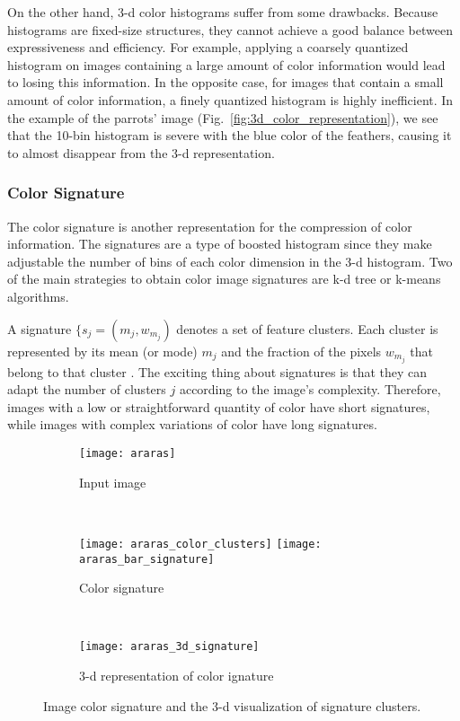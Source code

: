 On the other hand, 3-d color histograms suffer from some drawbacks. Because histograms are fixed-size structures, they cannot achieve a good balance between expressiveness and efficiency. For example, applying a coarsely quantized histogram on images containing a large amount of color information would lead to losing this information. In the opposite case, for images that contain a small amount of color information, a finely quantized histogram is highly inefficient. In the example of the parrots' image (Fig.\ \ref{fig:3d_color_representation}), we see that the 10-bin histogram is severe with the blue color of the feathers, causing it to almost disappear from the 3-d representation.

\subsubsection{Color Signature}

The color signature is another representation for the compression of color information. The signatures are a type of boosted histogram since they make adjustable the number of bins of each color dimension in the 3-d histogram. Two of the main strategies to obtain color image signatures are k-d tree or k-means algorithms.

A signature $\{s_j = (m_j, w_{m_j})$ denotes a set of feature clusters. Each cluster is represented by its mean (or mode) $m_j$ and the fraction of the pixels $w_{m_j}$ that belong to that cluster \citep{Rubner.Tomasi:Book:2001}. The exciting thing about signatures is that they can adapt the number of clusters $j$ according to the image's complexity. Therefore, images with a low or straightforward quantity of color have short signatures, while images with complex variations of color have long signatures.

\begin{figure}[!ht]
    \centering
    \begin{subfigure}[b]{0.25\textwidth}
        \texttt{[image: araras]}
        \caption{Input image}
    \end{subfigure} \\
    
    \begin{subfigure}[b]{0.4\textwidth}
    	\texttt{[image: araras\_color\_clusters]}
        \texttt{[image: araras\_bar\_signature]}
        \caption{Color signature}
    \end{subfigure}
    	~ %
    \begin{subfigure}[b]{0.5\textwidth}
        \texttt{[image: araras\_3d\_signature]}
        \caption{3-d representation of color ignature}
    \end{subfigure} 
    	    
    \caption{Image color signature and the 3-d visualization of signature clusters.}\label{fig:color_signature}    
\end{figure}

